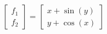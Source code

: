 \documentclass[preview]{standalone}
\begin{document}
\begin{align*}
\begin{bmatrix}f_1\\f_2\end{bmatrix}= \begin{bmatrix}x+ \sin(y)\\y+ \cos(x)\end{bmatrix}
\end{align*}
\end{document}
